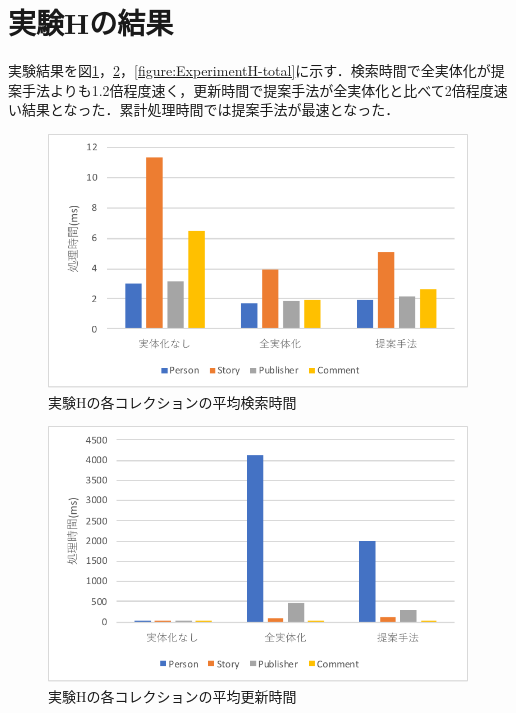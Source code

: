 \documentclass[a4paper,11pt]{ujreport}
\begin{document}
\section{実験Hの結果}
実験結果を図\ref{figure:ExperimentH-find}，\ref{figure:ExperimentH-update}，\ref{figure:ExperimentH-total}に示す．検索時間で全実体化が提案手法よりも1.2倍程度速く，更新時間で提案手法が全実体化と比べて2倍程度速い結果となった．累計処理時間では提案手法が最速となった．
\begin{figure}[htbp]
	\begin{center}
		\includegraphics[width=30em]{src/ExperimentH-find.pdf} %
	\end{center}
	\caption{実験Hの各コレクションの平均検索時間}
	\label{figure:ExperimentH-find}
\end{figure}
\begin{figure}[htbp]
	\begin{center}
		\includegraphics[width=30em]{src/ExperimentH-update.pdf} %
	\end{center}
	\caption{実験Hの各コレクションの平均更新時間}
	\label{figure:ExperimentH-update}
\end{figure}
\end{document}
